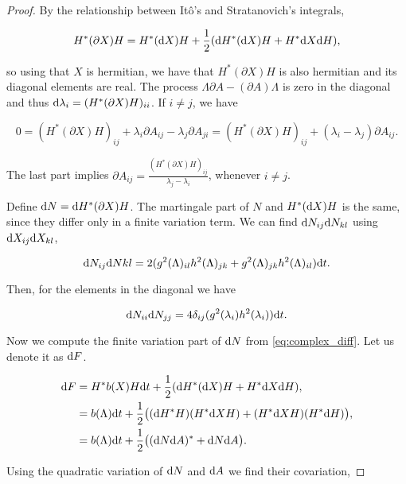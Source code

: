 \begin{proof}
    By the relationship between Itô's and Stratanovich's integrals,

    \begin{equation*}
        H^*(\partial X)H = H^*(\mathrm d X)H + \frac12(\mathrm d H^*(\mathrm d X)H + H^*\mathrm d X\mathrm d H),
    \end{equation*}

    \noindent so using that $X$ is hermitian, we have that $H^*(\partial X)H$ is also hermitian and its diagonal elements are real. The process $\Lambda \partial A - (\partial A)\Lambda$ is zero in the diagonal and thus $\mathrm d \lambda_i = (H^*(\partial X)H)_{ii}$.  If $i \neq j$, we have

    \[ 0 = (H^*(\partial X)H)_{ij} + \lambda_i\partial A_{ij} - \lambda_j \partial A_{ji} = (H^*(\partial X)H)_{ij} + (\lambda_i - \lambda_j)\partial A_{ij}. \]

    The last part implies $\partial A_{ij} = \frac{(H^*(\partial X)H)_{ij}}{\lambda_j - \lambda_i}$, whenever $i\neq j$.

    Define $\mathrm d N = \mathrm d H^*(\partial X)H$. The martingale part of $N$ and $H^*(\mathrm d X)H$ is the same, since they differ only in a finite variation term. We can find $\mathrm d N_{ij}\mathrm d N_{kl}$ using $\mathrm d X_{ij} \mathrm d X_{kl}$,

    \begin{equation*}
        \mathrm d N_{ij}\mathrm d N{kl} = 2(g^2(\Lambda)_{il}h^2(\Lambda)_{jk} + g^2(\Lambda)_{jk}h^2(\Lambda)_{il})\mathrm d t.
    \end{equation*}

    Then, for the elements in the diagonal we have

    \begin{equation}
        \mathrm d N_{ii}\mathrm d N_{jj} = 4\delta_{ij}(g^2(\lambda_i)h^2(\lambda_i))\mathrm d t.
    \end{equation}

    Now we compute the finite variation part of $\mathrm d N$ from \eqref{eq:complex_diff}. Let us denote it as $\mathrm d F$.

    \begin{align*}
        \mathrm d F &= H^*b(X)H\mathrm d t + \frac12(\mathrm d H^*(\mathrm d X)H + H^*\mathrm d X\mathrm d H),\\
             &= b(\Lambda)\mathrm d t + \frac12 \bigl((\mathrm d H^*H) (H^*\mathrm d XH) + (H^*\mathrm d X H)(H^*\mathrm d H)\bigr),\\
             &= b(\Lambda)\mathrm d t + \frac12\bigl((\mathrm d N \mathrm d A)^* + \mathrm d N \mathrm d A \bigr).
    \end{align*}

    Using the quadratic variation of $\mathrm d N$ and $\mathrm d A$ we find their covariation,


\end{proof}

